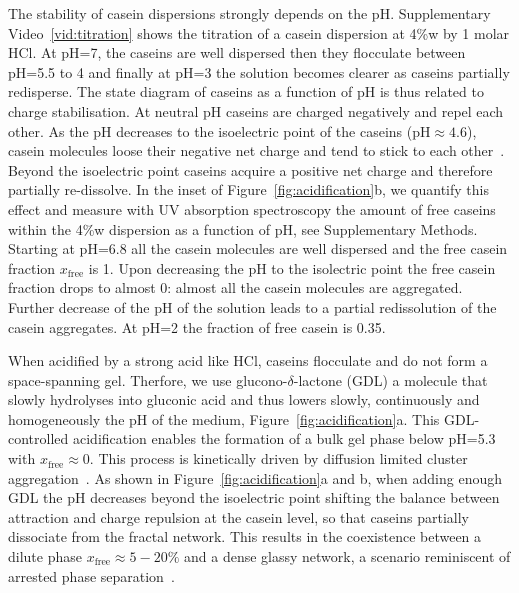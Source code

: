 \documentclass[twocolumn,superscriptaddress,showpacs,preprintnumbers,
amsmath,amssymb,prl]{revtex4-1}
\begin{document}
The stability of casein dispersions strongly depends on the pH. Supplementary Video~\ref{vid:titration} shows the titration of a casein dispersion at 4\%w by 1 molar HCl. At pH=7, the caseins are well dispersed then they flocculate between pH=5.5 to 4 and finally at pH=3 the solution becomes clearer as caseins partially redisperse. The state diagram of caseins as a function of pH is thus related to charge stabilisation. At neutral pH caseins are charged negatively and repel each other. As the pH decreases to the isoelectric point of the caseins (pH$\approx 4.6$), casein molecules loose their negative net charge and tend to stick to each other~\cite{Roefs1986,Bremer1989,Lucey1998,Dickinson2002}. Beyond the isoelectric point caseins acquire a positive net charge and therefore partially re-dissolve. In the inset of Figure~\ref{fig:acidification}b, we quantify this effect and measure with UV absorption spectroscopy the amount of free caseins within the 4\%w dispersion as a function of pH, see Supplementary Methods. Starting at pH=6.8 all the casein molecules are well dispersed and the free casein fraction $x_\text{free}$ is 1. Upon decreasing the pH to the isolectric point the free casein fraction drops to almost 0: almost all the casein molecules are aggregated. Further decrease of the pH of the solution leads to a partial redissolution of the casein aggregates. At pH=2 the fraction of free casein is 0.35.


When acidified by a strong acid like HCl, caseins flocculate and do not form a space-spanning gel. Therfore, we use glucono-$\delta$-lactone (GDL) a molecule that slowly hydrolyses into gluconic acid and thus lowers slowly, continuously and homogeneously the pH of the medium, Figure~\ref{fig:acidification}a. This GDL-controlled acidification enables the formation of a bulk gel phase below pH=5.3 with $x_\text{free}\approx 0$. This process is kinetically driven by diffusion limited cluster aggregation~\cite{Bremer1989}. As shown in Figure~\ref{fig:acidification}a and b, when adding enough GDL the pH decreases beyond the isoelectric point shifting the balance between attraction and charge repulsion at the casein level, so that caseins partially dissociate from the fractal network. This results in the coexistence between a dilute phase $x_\text{free}\approx 5-20\%$ and a dense glassy network, a scenario reminiscent of arrested phase separation~\cite{Cardinaux2007,lu2008gelation}.
\end{document}
